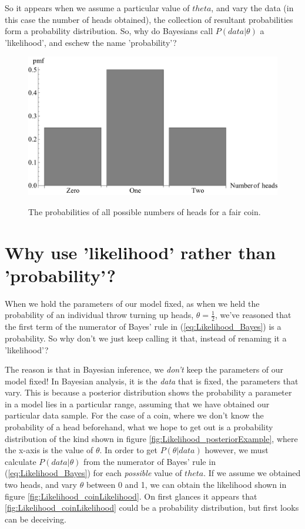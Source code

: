 \documentclass[11pt,fullpage]{book}
\begin{document}
So it appears when we assume a particular value of $theta$, and vary the data (in this case the number of heads obtained), the collection of resultant probabilities form a probability distribution. So, why do Bayesians call $P(data|\theta)$ a 'likelihood', and eschew the name 'probability'?

\begin{figure}
\centering
\scalebox{0.5} 
{\includegraphics{Likelihood_fairCoin.pdf}}
\caption{The probabilities of all possible numbers of heads for a fair coin.}\label{fig:Likelihood_fairCoin}
\end{figure}

\section{Why use 'likelihood' rather than 'probability'?}
When we hold the parameters of our model fixed, as when we held the probability of an individual throw turning up heads, $\theta=\frac{1}{2}$, we've reasoned that the first term of the numerator of Bayes' rule in (\ref{eq:Likelihood_Bayes}) is a probability. So why don't we just keep calling it that, instead of renaming it a 'likelihood'? 

The reason is that in Bayesian inference, we \textit{don't} keep the parameters of our model fixed! In Bayesian analysis, it is the \textit{data} that is fixed, the parameters that vary. This is because a posterior distribution shows the probability a parameter in a model lies in a particular range, assuming that we have obtained our particular data sample. For the case of a coin, where we don't know the probability of a head beforehand, what we hope to get out is a probability distribution of the kind shown in figure \ref{fig:Likelihood_posteriorExample}, where the x-axis is the value of $\theta$. In order to get $P(\theta|data)$ however, we must calculate $P(data|\theta)$ from the numerator of Bayes' rule in (\ref{eq:Likelihood_Bayes}) for each \textit{possible} value of $theta$. If we assume we obtained two heads, and vary $\theta$ between 0 and 1, we can obtain the likelihood shown in figure \ref{fig:Likelihood_coinLikelihood}. On first glances it appears that \ref{fig:Likelihood_coinLikelihood} could be a probability distribution, but first looks can be deceiving. 
\end{document}
